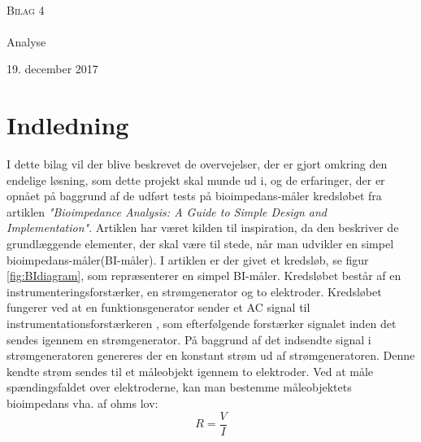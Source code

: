 



\begin{titlingpage}
\begin{center}

~ \\[3cm]


\textsc{\LARGE Bilag 4}\\[1.5cm]


\noindent\makebox[\linewidth]{\rule{\textwidth}{0.4pt}}\\
[0.5cm]{\Huge Analyse}
\noindent\makebox[\linewidth]{\rule{\textwidth}{0.4pt}}
\end{center}
\vfill
\begin{center}
{\large 19. december 2017}
\end{center}
\end{titlingpage}



\newpage
\tableofcontents*
\newpage


\chapter{Indledning}

I dette bilag vil der blive beskrevet de overvejelser, der er gjort omkring den endelige løsning, som dette projekt skal munde ud i, og de erfaringer, der er opnået på baggrund af de udført tests på bioimpedans-måler kredsløbet fra artiklen \textit{"Bioimpedance Analysis: A Guide to Simple Design and Implementation"}. Artiklen har været kilden til inspiration, da den beskriver de grundlæggende elementer, der skal være til stede, når man udvikler en simpel bioimpedans-måler(BI-måler). I artiklen er der givet et kredsløb, se figur \ref{fig:BIdiagram}, som repræsenterer en simpel BI-måler. Kredsløbet består af en instrumenteringsforstærker, en strømgenerator og to elektroder. Kredsløbet fungerer ved at en funktionsgenerator sender et AC signal til instrumentationsforstærkeren , som efterfølgende forstærker signalet inden det sendes igennem en strømgenerator. På baggrund af det indsendte signal i strømgeneratoren genereres der en konstant strøm ud af strømgeneratoren. Denne kendte strøm sendes til et måleobjekt igennem to elektroder. Ved at måle spændingsfaldet over elektroderne, kan man bestemme måleobjektets bioimpedans vha. af ohms lov: $$R=\frac{V}{I}$$


